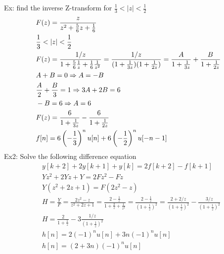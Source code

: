 \documentclass[11pt, fleqn]{article}
\begin{document}
Ex: find the inverse Z-transform for $\frac{1}{3}<|z|<\frac{1}{2}$
\begin{align*}
    &F(z)=\frac{z}{z^2+\frac{5}{6}z+\frac{1}{6}}\\
    &\frac{1}{3}<|z|<\frac{1}{2}\\
    &F(z)=\frac{1/z}{1+\frac{5}{6}\frac{1}{z}+\frac{1}{6}\frac{1}{z^2}}=\frac{1/z}{(1+\frac{1}{3z})(1+\frac{1}{2z})}=\frac{A}{1+\frac{1}{3z}}+\frac{B}{1+\frac{1}{2z}}\\
    &A+B=0\Ra A=-B\\
    &\frac{A}{2}+\frac{B}{3}=1\Ra 3A+2B=6\\
    &-B=6\Ra A=6\\
    &F(z)=\frac{6}{1+\frac{1}{3z}}-\frac{6}{1+\frac{1}{2z}}\\
    &f[n]=6\brround{-\frac{1}{3}}^nu[n]+6\brround{-\frac{1}{2}}^nu[-n-1]
\end{align*}
Ex2: Solve the following difference equation
\begin{align*}
    &y[k+2]+2y[k+1]+y[k]=2f[k+2]-f[k+1]\\
    &Yz^2+2Yz+Y=2Fz^2-Fz\\
    &Y(z^2+2z+1)=F(2z^2-z)\\
    &H=\frac{Y}{F}=\frac{2z^2-z}{z^2+2z+1}=\frac{2-\frac{1}{z}}{1+\frac{2}{z}+\frac{1}{z^2}}=\frac{2-\frac{1}{z}}{(1+\frac{1}{z})^2}=\frac{2+2/z}{(1+\frac{1}{z})^2}-\frac{3/z}{(1+\frac{1}{z})^2}\\
    &H=\frac{2}{1+\frac{1}{z}}-3\frac{1/z}{(1+\frac{1}{z})^2}\\
    &h[n]=2(-1)^nu[n]+3n(-1)^nu[n]\\
    &h[n]=(2+3n)(-1)^nu[n]
\end{align*}






































\end{document}
